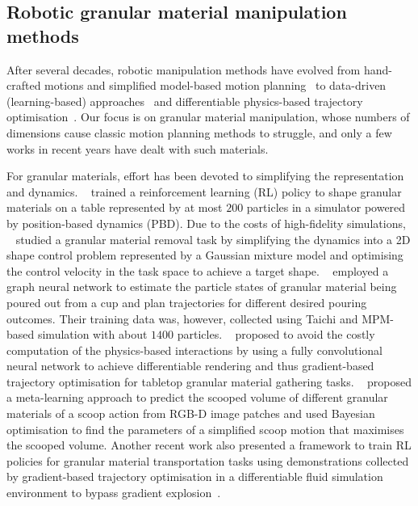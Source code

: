 \documentclass[letterpaper, 10 pt, journal, twoside]{ieeetran}
\begin{document}
\subsection{Robotic granular material manipulation methods}
After several decades, robotic manipulation methods have evolved from hand-crafted motions and simplified model-based motion planning~\cite{dong2023review} to data-driven (learning-based) approaches~\cite{kroemer2021review} and differentiable physics-based trajectory optimisation~\cite{yin2021modeling,newbury2024review}. Our focus is on granular material manipulation, whose numbers of dimensions cause classic motion planning methods to struggle, and only a few works in recent years have dealt with such materials.

For granular materials, effort has been devoted to simplifying the representation and dynamics.
\citeauthor*{zhang2020learning}~\cite{zhang2020learning} trained a reinforcement learning (RL) policy to shape granular materials on a table represented by at most $200$ particles in a simulator powered by position-based dynamics (PBD). Due to the costs of high-fidelity simulations, \citeauthor*{mateo2020manipulation}~\cite{mateo2020manipulation} studied a granular material removal task by simplifying the dynamics into a 2D shape control problem represented by a Gaussian mixture model and optimising the control velocity in the task space to achieve a target shape. \citeauthor*{tuomainen2022manipulation}~\cite{tuomainen2022manipulation} employed a graph neural network to estimate the particle states of granular material being poured out from a cup and plan trajectories for different desired pouring outcomes. Their training data was, however, collected using Taichi and MPM-based simulation with about $1400$ particles. \citeauthor*{xue2023neural}~\cite{xue2023neural} proposed to avoid the costly computation of the physics-based interactions by using a fully convolutional neural network to achieve differentiable rendering and thus gradient-based trajectory optimisation for tabletop granular material gathering tasks. \citeauthor*{zhu2023fewshot}~\cite{zhu2023fewshot} proposed a meta-learning approach to predict the scooped volume of different granular materials of a scoop action from RGB-D image patches and used Bayesian optimisation to find the parameters of a simplified scoop motion that maximises the scooped volume. Another recent work also presented a framework to train RL policies for granular material transportation tasks using demonstrations collected by gradient-based trajectory optimisation in a differentiable fluid simulation environment to bypass gradient explosion~\cite{wei2024automachef}.
\end{document}
